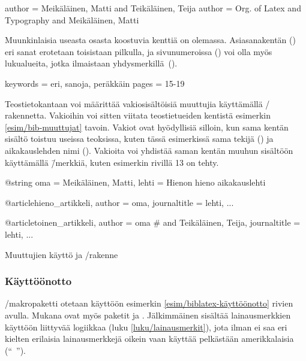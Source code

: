\begin{koodilohkosis}
author = {Meikäläinen, Matti and Teikäläinen, Teija}
author = {{Org. of Latex and Typography} and Meikäläinen, Matti}
\end{koodilohkosis}

Muunkinlaisia useasta osasta koostuvia kenttiä on olemassa.
Asiasanakentän () eri sanat erotetaan toisistaan
pilkulla, ja sivunumeroissa () voi olla myös lukualueita,
jotka ilmaistaan yhdysmerkillä~\mbox{(\koodi{-})}.

\begin{koodilohkosis}
keywords = {eri, sanoja, peräkkäin}
pages = {15-19}
\end{koodilohkosis}

Teostietokantaan voi määrittää vakiosisältöisiä muuttujia käyttämällä
\-/ rakennetta. Vakioihin voi sitten viitata
teostietueiden kentistä esimerkin \ref{esim/bib-muuttujat} tavoin.
Vakiot ovat hyödyllisiä silloin, kun sama kentän sisältö toistuu useissa
teoksissa, kuten tässä esimerkissä sama tekijä () ja
aikakauslehden nimi (). Vakioita voi yhdistää
saman kentän muuhun sisältöön käyttämällä \koodi{\#}\=/merkkiä, kuten
esimerkin rivillä 13 on tehty.

\begin{esimerkki*}
\begin{koodilohko}
@string{
  oma = {Meikäläinen, Matti},
  lehti = {Hienon hieno aikakauslehti}
}

@article{hieno_artikkeli,
  author = oma,
  journaltitle = lehti,
  ...
}

@article{toinen_artikkeli,
  author = oma # { and Teikäläinen, Teija},
  journaltitle = lehti,
  ...
}
\end{koodilohko}
  \caption{Muuttujien käyttö ja \-/rakenne}
  \label{esim/bib-muuttujat}
\end{esimerkki*}

\subsubsection{Käyttöönotto}

\-/makropaketti otetaan käyttöön esimerkin
\ref{esim/biblatex-käyttöönotto} rivien avulla. Mukana ovat myös paketit
 ja . Jälkimmäinen sisältää
lainausmerkkien käyttöön liittyvää logiikkaa (luku
\ref{luku/lainausmerkit}), jota ilman  ei saa eri
kielten erilaisia lainausmerkkejä oikein vaan käyttää pelkästään
amerikkalaisia (``~'').


